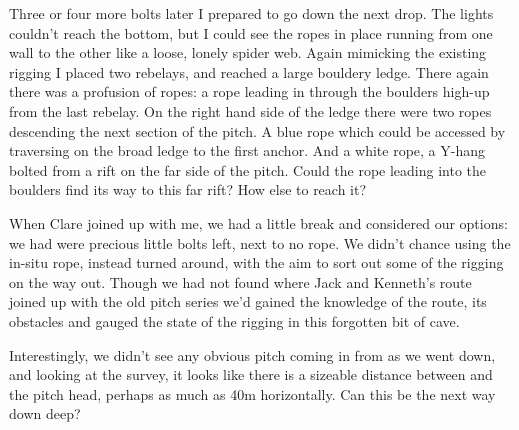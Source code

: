 Three or four more bolts later I prepared to go down the next drop. The lights couldn't reach the bottom, but I could see the ropes in place running from one wall to the other like a loose, lonely spider web. Again mimicking the existing rigging I placed two rebelays, and reached a large bouldery ledge. There again there was a profusion of ropes: a rope leading in through the boulders high-up from the last rebelay. On the right hand side of the ledge there were two ropes descending the next section of the pitch. A blue rope which could be accessed by traversing on the broad ledge to the first anchor. And a white rope, a Y-hang bolted from a rift on the far side of the pitch. Could the rope leading into the boulders find its way to this far rift?  How else to reach it?

When Clare joined up with me, we had a little break and considered our options: we had were precious little bolts left, next to no rope. We didn't chance using the in-situ rope, instead turned around, with the aim to sort out some of the rigging on the way out. Though we had not found where Jack and Kenneth's route joined up with the old pitch series  we'd gained the knowledge of the route, its obstacles and gauged the state of the rigging in this forgotten bit of cave. 



Interestingly, we didn't see any obvious pitch coming in from  as we went down, and looking at the survey, it looks like there is a sizeable distance between  and the pitch head, perhaps as much as 40m horizontally. Can this be the next way down deep?

